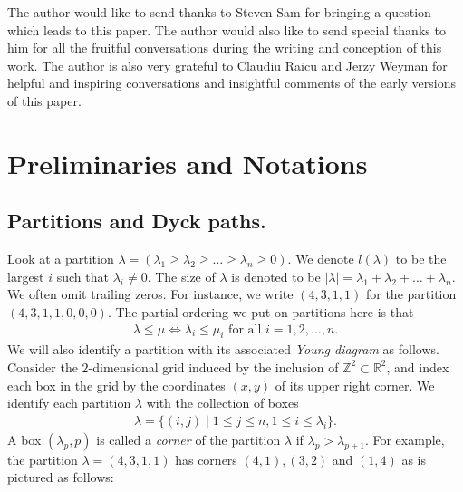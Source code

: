\documentclass[12pt]{amsart}
\theoremstyle{definition}
\theoremstyle{remark}
\newcommand{\bbR}{\mathbb{R}}
\newcommand{\bbZ}{\mathbb{Z}}
\numberwithin{equation}{section}
\begin{document}
The author would like to send thanks to Steven Sam for bringing a question which leads to this paper. The author would also like to send special thanks to him for all the fruitful conversations during the writing and conception of this work. The author is also very grateful to Claudiu Raicu and Jerzy Weyman for helpful and inspiring conversations and insightful comments of the early versions of this paper. 


\section{Preliminaries and Notations} \label{section:Preliminary}
\subsection{Partitions and Dyck paths.} \label{subsection:partition+Dyck}
Look at a partition $\lambda = (\lambda_1 \geq \lambda_2 \geq \ldots \geq \lambda_n \geq 0)$. We denote $l(\lambda)$ to be the largest $i$ such that $\lambda_i \neq 0$. The size of $\lambda$ is denoted to be $|\lambda| = \lambda_1 + \lambda_2 + \ldots + \lambda_n$. We often omit trailing zeros. For instance, we write $(4,3,1,1)$ for the partition $(4,3,1,1,0,0,0)$. The partial ordering we put on partitions here is that
\begin{align} \label{def:partialordering}
    \lambda \leq \mu  \iff  \lambda_i \leq \mu_i \text{ for all } i=1,2,\ldots,n. 
\end{align}
We will also identify a partition with its associated \emph{Young diagram} as follows. Consider the $2$-dimensional grid induced by the inclusion of $\bbZ^2 \subset \bbR^2$, and index each box in the grid by the coordinates $(x,y)$ of its upper right corner. We identify each partition $\lambda$ with the collection of boxes
\begin{align} \label{def:partition}
    \lambda = \{(i,j) \mid 1 \leq j \leq n, 1 \leq i \leq \lambda_i  \}.
\end{align}
A box $(\lambda_p,p)$ is called a \emph{corner} of the partition $\lambda$ if $\lambda_p > \lambda_{p+1}$. For example, the partition $\lambda = (4,3,1,1)$ has corners $(4,1),(3,2)$ and $(1,4)$ as is pictured as follows:
\begin{center}
%
\end{center}
\end{document}
